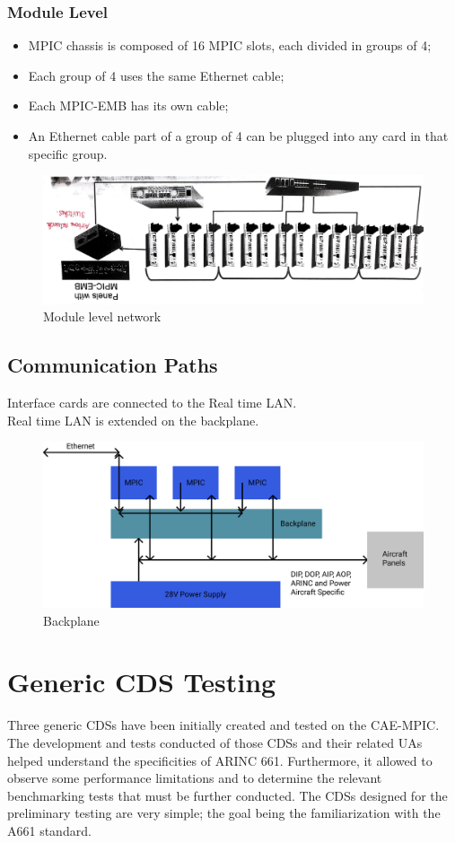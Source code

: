        \subsubsection{Module Level}
            \begin{itemize}
                \item MPIC chassis is composed of 16 MPIC slots, each divided in groups of 4;
                \item Each group of 4 uses the same Ethernet cable;
                \item Each MPIC-EMB has its own cable;
                \item An Ethernet cable part of a group of 4 can be plugged into any card in that specific group.
            \end{itemize}
            \begin{figure}
                \centering
                \includegraphics[width=0.6\linewidth]{img/Module-level.png}
                \caption{Module level network}
            \end{figure}
    \subsection{Communication Paths}
        Interface cards are connected to the Real time LAN. \\ 
        \vspace{3mm}
        Real time LAN is extended on the backplane.
        \begin{figure}[H]
            \centering
            \includegraphics[width=0.6\linewidth]{img/communication path.png}
            \caption{Backplane}
        \end{figure}
    

\section{Generic CDS Testing}
    Three generic CDSs have been initially created and tested on the CAE-MPIC. The development and tests conducted of those 
    CDSs and their related UAs helped understand the specificities of ARINC 661. Furthermore, it allowed to observe some 
    performance limitations and to determine the relevant benchmarking tests that must be further conducted. The CDSs designed 
    for the preliminary testing are very simple; the goal being the familiarization with the A661 standard.
